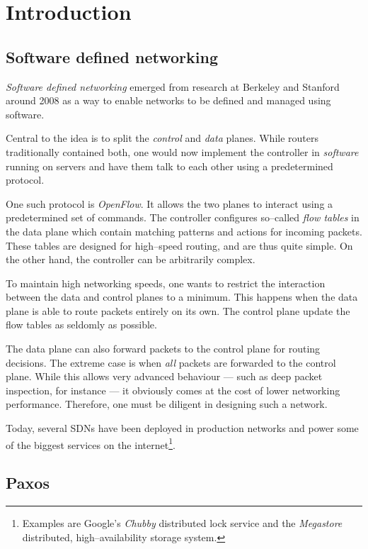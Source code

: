 \chapter{Introduction}

\section{Software defined networking}

{\em Software defined networking} emerged from research at Berkeley and
Stanford around 2008 as a way to enable networks to be defined and managed
using software.

Central to the idea is to split the {\em control} and {\em data} planes.
While routers traditionally contained both, one would now implement the
controller in {\em software} running on servers and have them talk to each
other using a predetermined protocol.

One such protocol is {\em OpenFlow}.  It allows the two
planes to interact using a predetermined set of commands.  The controller
configures so--called {\em flow tables} in the data plane 
which contain matching patterns and actions for incoming packets.  These
tables are designed for high--speed routing, and are thus quite simple.  On
the other hand, the controller can be arbitrarily complex.

To maintain high networking speeds, one wants to restrict the interaction
between the data and control planes to a minimum.  This happens when the
data plane is able to route packets entirely on its own.  The control plane
update the flow tables as seldomly as possible.

The data plane can also forward packets to the control plane for routing decisions. The extreme case is when {\em all} packets are
forwarded to the control plane.  While this allows very advanced behaviour
--- such as deep packet inspection, for instance --- it obviously comes at
the cost of lower networking performance.  Therefore, one must be diligent
in designing such a network.

Today, several SDNs have been deployed in production networks and power some
of the biggest services on the internet\footnote{Examples are Google's {\em
Chubby} distributed lock service and the {\em Megastore} distributed,
high--availability storage system.}.

\section{Paxos}

